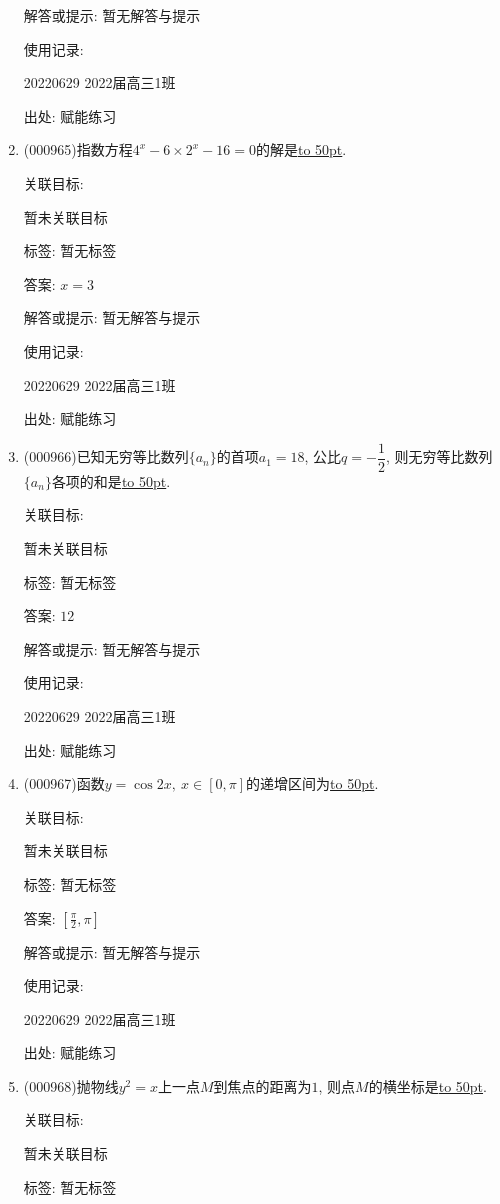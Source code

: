 \documentclass[10pt,a4paper]{article}
\newcommand{\blank}[1]{\underline{\hbox to #1pt{}}}
\begin{document}
\begin{enumerate}[1.]
解答或提示: 暂无解答与提示

使用记录:

20220629    2022届高三1班  	


出处: 赋能练习
\item { (000965)}指数方程$4^x-6 \times 2^x-16=0$的解是\blank{50}.


关联目标:

暂未关联目标



标签: 暂无标签

答案: $x=3$

解答或提示: 暂无解答与提示

使用记录:

20220629    2022届高三1班  	


出处: 赋能练习
\item { (000966)}已知无穷等比数列$\{a_n\}$的首项$a_1=18$, 公比$q=-\dfrac12$, 则无穷等比数列$\{a_n\}$各项的和是\blank{50}.


关联目标:

暂未关联目标



标签: 暂无标签

答案: $12$

解答或提示: 暂无解答与提示

使用记录:

20220629    2022届高三1班  	


出处: 赋能练习
\item { (000967)}函数$y=\cos 2x, \ x\in [0,\pi]$的递增区间为\blank{50}.


关联目标:

暂未关联目标



标签: 暂无标签

答案: $[\frac{\pi}2,\pi]$

解答或提示: 暂无解答与提示

使用记录:

20220629    2022届高三1班  	


出处: 赋能练习
\item { (000968)}抛物线$y^2=x$上一点$M$到焦点的距离为$1$, 则点$M$的横坐标是\blank{50}.


关联目标:

暂未关联目标



标签: 暂无标签


\end{enumerate}
\end{document}
